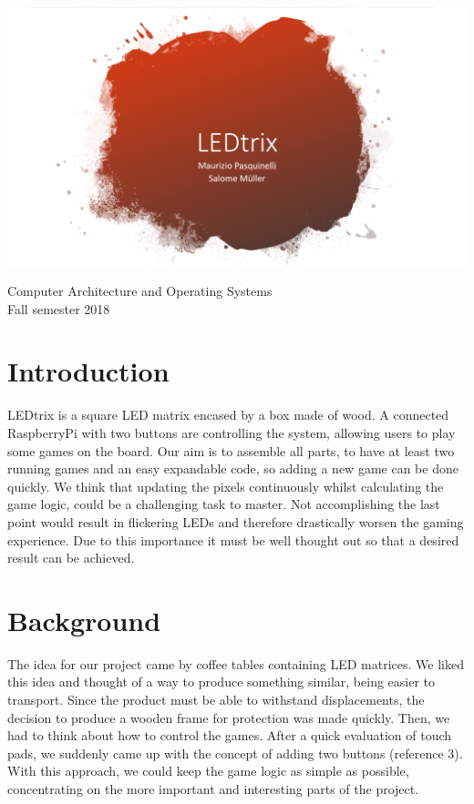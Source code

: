 \documentclass[a4paper,12pt]{article}
\begin{document}
\begin{titlepage}
\centering
\vspace*{5cm}

 \includegraphics[width = 1\textwidth]{LEDtrix_Logo.png}
\vspace{1cm}

\large{Computer Architecture and Operating Systems\\Fall semester 2018}
\end{titlepage}
 
 \section{Introduction}
 
 LEDtrix is a square LED matrix encased by a box made of wood. A connected RaspberryPi with two buttons are controlling the system, allowing users to play some games on the board.
 Our aim is to assemble all parts, to have at least two running games and an easy expandable code, so adding a new game can be done quickly.
 We think that updating the pixels continuously whilst calculating the game logic, could be a challenging task to master.
 Not accomplishing the last point would result in flickering LEDs and therefore drastically worsen the gaming experience.
 Due to this importance it must be well thought out so that a desired result can be achieved.
 
 \section{Background}
 
 The idea for our project came by coffee tables containing LED matrices.
 We liked this idea and thought of a way to produce something similar, being easier to transport.
 Since the product must be able to withstand displacements, the decision to produce a wooden frame for protection was made quickly.
 Then, we had to think about how to control the games.
 After a quick evaluation of touch pads, we suddenly came up with the concept of adding two buttons (reference 3).
 With this approach, we could keep the game logic as simple as possible, concentrating on the more important and interesting parts of the project.
 
\end{document}
